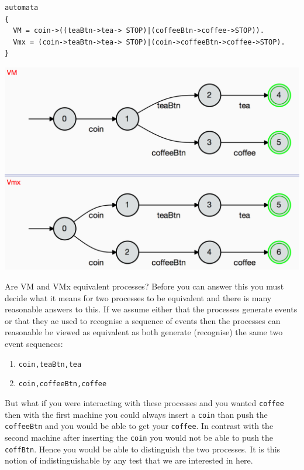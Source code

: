 \documentclass[]{article}
\begin{document}
\noindent\begin{center}
\begin{minipage}{0.8\textwidth}
\begin{center}\begin{verbatim}
automata
{
  VM = coin->((teaBtn->tea-> STOP)|(coffeeBtn->coffee->STOP)).
  Vmx = (coin->teaBtn->tea-> STOP)|(coin->coffeeBtn->coffee->STOP).
}
\end{verbatim}
\includegraphics[scale=0.4]{ND.png}
\end{center}\end{minipage}

\end{center}

Are  {\sf VM}  and {\sf VMx}  equivalent processes?  Before you can answer this you must decide what  it means for two processes to be equivalent and there is many reasonable answers to this. If we assume either that the processes generate events or that they ae used to recognise a sequence of events then the processes can reasonable be viewed as equivalent as both generate (recognise) the same two event sequences:
\begin{enumerate}
\item \verb|coin,teaBtn,tea|
\item \verb|coin,coffeeBtn,coffee|
\end{enumerate}

But what if you were interacting with these processes and you wanted \verb|coffee| then  with the first machine you could always insert a \verb|coin| than push the \verb|coffeeBtn| and you would be able to get your \verb|coffee|. In contrast with the second machine after inserting the \verb|coin| you would not be able to push the \verb|coffBtn|. Hence you would be able to distinguish the two processes. It is this notion of indistinguishable by any test that we are interested in here.
\end{document}
